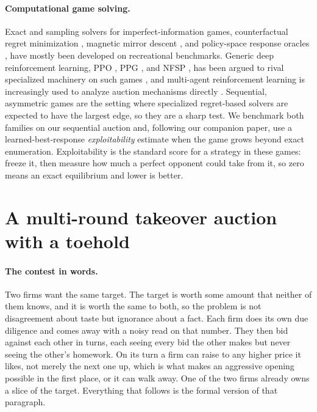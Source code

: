 \documentclass[11pt,a4paper]{article}
\begin{document}
\paragraph{Computational game solving.} Exact and sampling solvers for imperfect-information games, counterfactual regret minimization \citep{cfr2007,deepcfr2019}, magnetic mirror descent \citep{mmd2023}, and policy-space response oracles \citep{psro2017}, have mostly been developed on recreational benchmarks. Generic deep reinforcement learning, PPO \citep{ppo2017}, PPG \citep{ppg2021}, and NFSP \citep{nfsp2016}, has been argued to rival specialized machinery on such games \citep{rudolph2026}, and multi-agent reinforcement learning is increasingly used to analyze auction mechanisms directly \citep{deon2024}. Sequential, asymmetric games are the setting where specialized regret-based solvers are expected to have the largest edge, so they are a sharp test. We benchmark both families on our sequential auction and, following our companion paper, use a learned-best-response \emph{exploitability} estimate \citep{openspiel2019} when the game grows beyond exact enumeration. Exploitability is the standard score for a strategy in these games: freeze it, then measure how much a perfect opponent could take from it, so zero means an exact equilibrium and lower is better.

\section{A multi-round takeover auction with a toehold}
\label{sec:model}

\paragraph{The contest in words.} Two firms want the same target. The target is worth some amount that neither of them knows, and it is worth the same to both, so the problem is not disagreement about taste but ignorance about a fact. Each firm does its own due diligence and comes away with a noisy read on that number. They then bid against each other in turns, each seeing every bid the other makes but never seeing the other's homework. On its turn a firm can raise to any higher price it likes, not merely the next one up, which is what makes an aggressive opening possible in the first place, or it can walk away. One of the two firms already owns a slice of the target. Everything that follows is the formal version of that paragraph.
\end{document}
